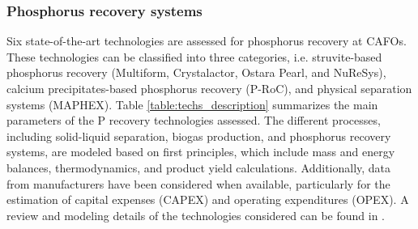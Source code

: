 \begin{refsection}[referencesCh5]
\subsubsection{Phosphorus recovery systems}

Six state-of-the-art technologies are assessed for phosphorus recovery at CAFOs. These technologies can be classified into three categories, i.e. struvite-based phosphorus recovery (Multiform, Crystalactor, Ostara Pearl, and NuReSys), calcium precipitates-based phosphorus recovery (P-RoC), and physical separation systems (MAPHEX). Table \ref{table:techs_description} summarizes the main parameters of the P recovery technologies assessed. The different processes, including solid-liquid separation, biogas production, and phosphorus recovery systems, are modeled based on first principles, which include mass and energy balances, thermodynamics, and product yield calculations. Additionally, data from manufacturers have been considered when available, particularly for the estimation of capital expenses (CAPEX) and operating expenditures (OPEX). A review and modeling details of the technologies considered can be found in \citet{Tool}.


\end{refsection}
